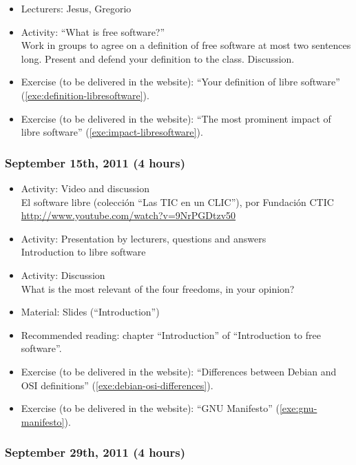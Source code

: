 \documentclass[a4paper]{article}
\begin{document}
\begin{itemize}
\item Lecturers: Jesus, Gregorio
\item Activity: ``What is free software?'' \\
  Work in groups to agree on a definition of free software at most two sentences long. Present and defend your definition to the class. Discussion.
\item Exercise (to be delivered in the website): ``Your definition of libre software'' (\ref{exe:definition-libresoftware}).
\item Exercise (to be delivered in the website): ``The most prominent impact of libre software'' (\ref{exe:impact-libresoftware}).
\end{itemize}

\subsubsection{September 15th, 2011 (4 hours)}

\begin{itemize}
\item Activity: Video and discussion \\
  El software libre (colección ``Las TIC en un CLIC''), por Fundación CTIC \\
  \url{http://www.youtube.com/watch?v=9NrPGDtzv50}
\item Activity: Presentation by lecturers, questions and answers \\
  Introduction to libre software
\item Activity: Discussion \\
  What is the most relevant of the four freedoms, in your opinion?
\item Material: Slides (``Introduction'')
\item Recommended reading: chapter ``Introduction'' of ``Introduction to free software''.
\item Exercise (to be delivered in the website): ``Differences between Debian and OSI definitions'' (\ref{exe:debian-osi-differences}).
\item Exercise (to be delivered in the website): ``GNU Manifesto'' (\ref{exe:gnu-manifesto}).
\end{itemize}

\subsubsection{September 29th, 2011 (4 hours)}
\end{document}

